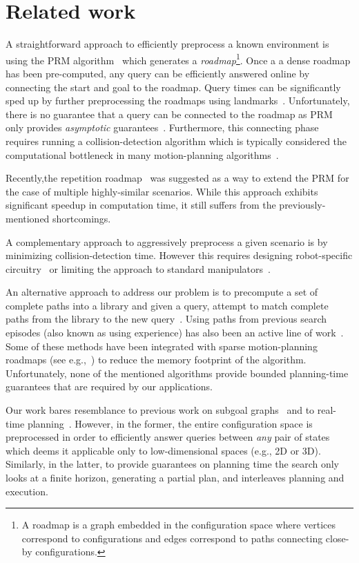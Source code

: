 \documentclass[letterpaper]{article} %
\begin{document}
\section{Related work}
\label{sec:rel}
A straightforward approach to efficiently preprocess a known environment is using the \textsf{PRM} algorithm~\cite{kavraki1996probabilistic} which generates a \emph{roadmap}\footnote{A roadmap is a graph embedded in the configuration space where vertices correspond to configurations and edges correspond to paths connecting close-by configurations.}.
Once a a dense roadmap has been pre-computed, any query can be efficiently answered online by connecting the start and goal to the roadmap. 
Query times can be significantly sped up by further preprocessing the roadmaps using landmarks~\cite{paden2017landmark}.
Unfortunately, there is no guarantee that a query can be connected to the roadmap as \textsf{PRM} only provides \emph{asymptotic} guarantees~\cite{KKL98}.
Furthermore, this connecting phase requires running a collision-detection algorithm which is typically considered the computational bottleneck in many motion-planning algorithms~\cite{L06}.

Recently,the repetition roadmap~\cite{LA18} was suggested as a way to extend the \textsf{PRM} for the case of multiple highly-similar scenarios.
While this approach exhibits significant speedup in computation time, it still suffers from the previously-mentioned shortcomings.

A complementary approach to aggressively preprocess a given scenario is by minimizing collision-detection time.
However this requires designing robot-specific
circuitry~\cite{MFQSK16}
or limiting the approach to standard manipulators~\cite{YMILV18}.

An alternative approach to address our problem is to precompute a set of complete paths into a library and given a query, attempt to match complete paths from the library to the new query~\cite{berenson2012robot,jetchev2013fast}.
Using paths from previous search episodes (also known as using experience) has also been an active line of work~\cite{PCCL12,PDCL13,BAG12,CSMOC15}.
Some of these methods have been integrated with sparse motion-planning roadmaps (see e.g.,~\cite{SSAH14,DB14}) to reduce the memory footprint of the algorithm.
Unfortunately, none of the mentioned algorithms provide bounded planning-time guarantees that are required by our applications.

Our work bares resemblance to previous work on 
subgoal graphs~\cite{UK17,UK18} and to real-time planning~\cite{KL06,KS09,K90}.
However, in the former, the entire configuration space is preprocessed in order to efficiently answer queries between \emph{any} pair of states which deems it applicable only to low-dimensional spaces (e.g., 2D or 3D).
Similarly, in the latter, to provide guarantees on planning time the search only looks at a finite horizon, generating a partial plan,  and interleaves planning and execution.
\end{document}
